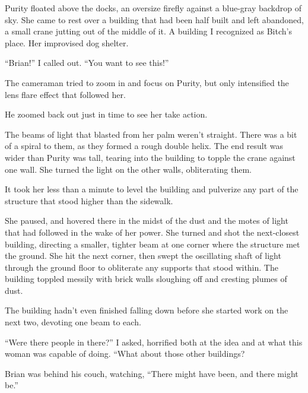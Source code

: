





Purity floated above the docks, an oversize firefly against a blue-gray backdrop of sky.  She came to rest over a building that had been half built and left abandoned, a small crane jutting out of the middle of it.  A building I recognized as Bitch's place.  Her improvised dog shelter.



``Brian!'' I called out.  ``You want to see this!''



The cameraman tried to zoom in and focus on Purity, but only intensified the lens flare effect that followed her.



He zoomed back out just in time to see her take action.



The beams of light that blasted from her palm weren't straight.  There was a bit of a spiral to them, as they formed a rough double helix.  The end result was wider than Purity was tall, tearing into the building to topple the crane against one wall.  She turned the light on the other walls, obliterating them.



It took her less than a minute to level the building and pulverize any part of the structure that stood higher than the sidewalk.



She paused, and hovered there in the midst of the dust and the motes of light that had followed in the wake of her power.  She turned and shot the next-closest building, directing a smaller, tighter beam at one corner where the structure met the ground.  She hit the next corner, then swept the oscillating shaft of light through the ground floor to obliterate any supports that stood within.  The building toppled messily with brick walls sloughing off and cresting plumes of dust.



The building hadn't even finished falling down before she started work on the next two, devoting one beam to each.



``Were there people in there?'' I asked, horrified both at the idea and at what this woman was capable of doing. ``What about those other buildings?



Brian was behind his couch, watching, ``There might have been, and there might be.''



